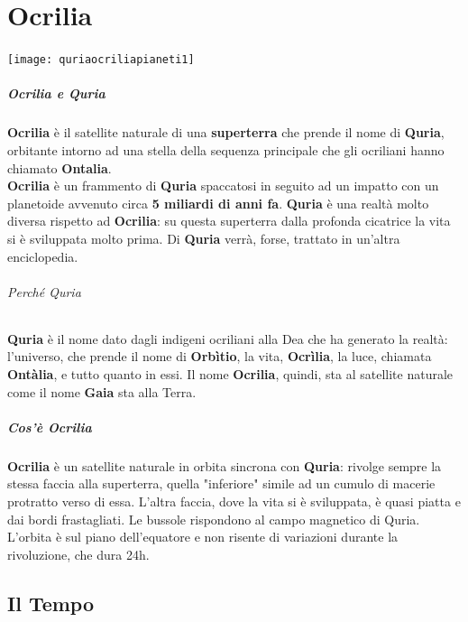 \documentclass[10pt,twoside,onecolumn,openany]{book}
\begin{document}
\chapter{Ocrilia}
\begin{center}
\texttt{[image: quriaocriliapianeti1]}
\end{center}
\begin{multicols}{2}
\paragraph{Ocrilia e Quria} \textbf{Ocrilia} è il satellite naturale di una \textbf{superterra} che prende il nome di \textbf{Quria}, orbitante intorno ad una stella della sequenza principale che gli ocriliani hanno chiamato \textbf{Ontalia}.\\
\textbf{Ocrilia} è un frammento di \textbf{Quria} spaccatosi in seguito ad un impatto con un planetoide avvenuto circa \textbf{5 miliardi di anni fa}. \textbf{Quria} è una realtà molto diversa rispetto ad \textbf{Ocrilia}: su questa superterra dalla profonda cicatrice la vita si è sviluppata molto prima. Di \textbf{Quria} verrà, forse, trattato in un'altra enciclopedia.
\columnbreak
\subparagraph{Perché Quria} \textbf{Quria} è il nome dato dagli indigeni ocriliani alla Dea che ha generato la realtà: l'universo, che prende il nome di \textbf{Orbìtio}, la vita, \textbf{Ocrìlia}, la luce, chiamata \textbf{Ontàlia}, e tutto quanto in essi. Il nome \textbf{Ocrilia}, quindi, sta al satellite naturale come il nome \textbf{Gaia} sta alla Terra.
\end{multicols}
\paragraph{Cos'è Ocrilia} \textbf{Ocrilia} è un satellite naturale in orbita sincrona con \textbf{Quria}: rivolge sempre la stessa faccia alla superterra, quella "inferiore" simile ad un cumulo di macerie protratto verso di essa. L'altra faccia, dove la vita si è sviluppata, è quasi piatta e dai bordi frastagliati. Le bussole rispondono al campo magnetico di Quria. L'orbita è sul piano dell'equatore e non risente di variazioni durante la rivoluzione, che dura 24h.\\
\newpage
\section{Il Tempo}
\end{document}
